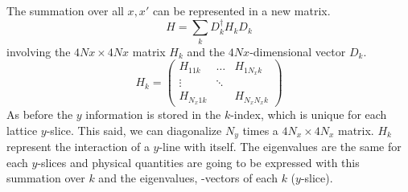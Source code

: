 \documentclass[../main.tex]{subfile}
\begin{document}
The summation over all $x,x'$ can be represented in a new matrix.
\[
    H = \sum_k D_k^{\dagger} H_k D_k
\]
involving the $4Nx \times 4Nx$ matrix $H_k$ and the $4Nx$-dimensional vector $D_k$.
\[
    H_k = \begin{pmatrix}
        H_{11k} &\dots & H_{1N_xk}\\
        \vdots&\ddots&\\
        H_{N_x1k} & & H_{N_xN_xk}
    \end{pmatrix}
\]
As before the $y$ information is stored in the $k$-index, which is unique for each lattice $y$-slice. This said, we 
can diagonalize $N_y$ times a $4N_x \times 4N_x$ matrix. $H_k$ represent the interaction of a $y$-line with itself.
The eigenvalues are the same for each $y$-slices and physical
quantities are going to be expressed with this summation over $k$ and the eigenvalues, -vectors of each $k$ ($y$-slice).\\
\end{document}
